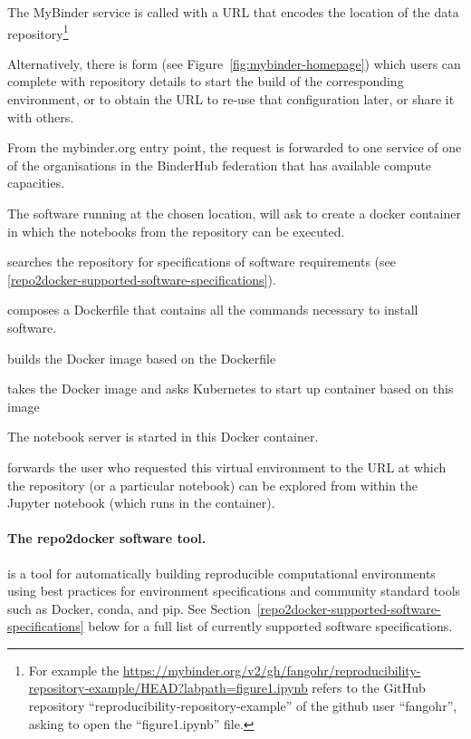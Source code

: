 \begin{compactitem}
\item The MyBinder service is called with a URL that encodes the location of the data
  repository\footnote{For example the 
    {\url{https://mybinder.org/v2/gh/fangohr/reproducibility-repository-example/HEAD?labpath=figure1.ipynb}}
    refers to the GitHub repository ``reproducibility-repository-example'' of the
    github user ``fangohr'', asking to open the ``figure1.ipynb'' file.}

  Alternatively, there is form (see Figure~\ref{fig:mybinder-homepage})
  which users can complete with repository details
  to start the build of the corresponding environment, or to obtain the URL to
  re-use that configuration later, or share it with others.
\item From the mybinder.org entry point, the request is forwarded to one
  \binderhub{} service of one of the organisations in the BinderHub federation
  that has available compute capacities.
\item The \binderhub{} software running at the chosen location, will ask
  \repotodocker{} to create a docker container in which the notebooks from the repository can be executed.
\item \repotodocker{} searches the repository for specifications of software requirements (see \ref{repo2docker-supported-software-specifications}).
\item \repotodocker{} composes a Dockerfile that contains all the commands
  necessary to install software.
\item \repotodocker{} builds the Docker image based on the Dockerfile
\item \binderhub{} takes the Docker image and asks Kubernetes to start up
  container based on this image
\item The notebook server is started in this Docker container.
\item \binderhub{} forwards the user who requested this virtual environment to
  the URL at which the repository (or a particular notebook) can be explored
  from within the Jupyter notebook (which runs in the container).
\end{compactitem}

\paragraph{The repo2docker software tool.}\label{sec:repo2docker}

\repotodocker{} is a tool for automatically building reproducible computational
environments using best practices for environment specifications and
community standard tools such as Docker, conda, and pip. See
Section~\ref{repo2docker-supported-software-specifications} below for a full list of
currently supported software specifications.

